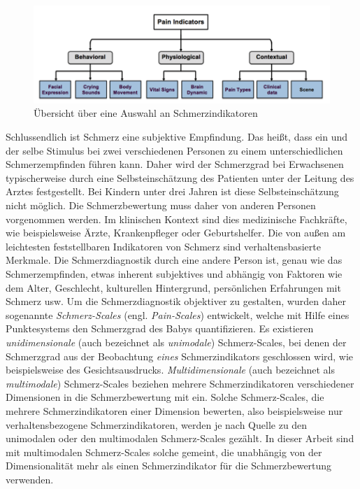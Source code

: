 \begin{figure}[H]
	\centering
	\includegraphics[width=1\textwidth]{bilder/painDimensions.png}
	\caption[Übersicht über Schmerzindikatoren]{Übersicht über eine Auswahl an Schmerzindikatoren \cite[S. 2]{overview}}
	\label{img:painIndicators}
\end{figure}

Schlussendlich ist Schmerz eine subjektive Empfindung. Das heißt, dass ein und der selbe Stimulus bei zwei verschiedenen Personen zu einem unterschiedlichen Schmerzempfinden führen kann. Daher wird der Schmerzgrad bei Erwachsenen typischerweise durch eine Selbsteinschätzung des Patienten unter der Leitung des Arztes festgestellt. Bei Kindern unter drei Jahren ist diese Selbsteinschätzung nicht möglich. Die Schmerzbewertung muss daher von anderen Personen vorgenommen werden. Im klinischen Kontext sind dies medizinische Fachkräfte, wie beispielsweise Ärzte, Krankenpfleger oder Geburtshelfer. Die von außen am leichtesten feststellbaren Indikatoren von Schmerz sind verhaltensbasierte Merkmale. Die Schmerzdiagnostik durch eine andere Person ist, genau wie das Schmerzempfinden, etwas inherent subjektives und abhängig von Faktoren wie dem Alter, Geschlecht, kulturellen Hintergrund, persönlichen Erfahrungen mit Schmerz usw.\cite[S. 1 - 3]{overview} \cite[S. 438]{PainAssessment01} Um die Schmerzdiagnostik objektiver zu gestalten, wurden daher sogenannte \emph{Schmerz-Scales} (engl. \emph{Pain-Scales}) entwickelt, welche mit Hilfe eines Punktesystems den Schmerzgrad des Babys quantifizieren.\cite[S. 240]{painAssessmentStatus} Es existieren \emph{unidimensionale} (auch bezeichnet als \emph{unimodale}) Schmerz-Scales, bei denen der Schmerzgrad aus der Beobachtung \emph{eines} Schmerzindikators geschlossen wird, wie beispielsweise des Gesichtsausdrucks. \emph{Multidimensionale} (auch bezeichnet als \emph{multimodale}) Schmerz-Scales beziehen mehrere Schmerzindikatoren verschiedener Dimensionen in die Schmerzbewertung mit ein. Solche Schmerz-Scales, die mehrere Schmerzindikatoren einer Dimension bewerten, also beispielsweise nur verhaltensbezogene Schmerzindikatoren, werden je nach Quelle zu den unimodalen oder den multimodalen Schmerz-Scales gezählt. In dieser Arbeit sind mit multimodalen Schmerz-Scales solche gemeint, die unabhängig von der Dimensionalität mehr als einen Schmerzindikator für die Schmerzbewertung verwenden.\cite[S. 68 - 69, 80 - 81]{PainAssessment02} \cite[S. 1-2, 31]{overview} \cite[S. 404]{PainAssessment03} 


